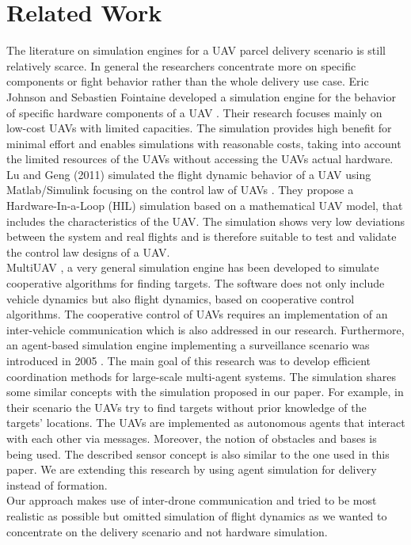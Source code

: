 \section{Related Work}
The literature on simulation engines for a UAV parcel delivery scenario is still relatively scarce. In general the researchers concentrate more on specific components or fight behavior rather than the whole delivery use case. Eric Johnson and Sebastien Fointaine developed a simulation engine for the behavior of specific hardware components of a UAV \cite{johnson.2001}. Their research focuses mainly on low-cost UAVs with limited capacities. The simulation provides high benefit for minimal effort and enables simulations with reasonable costs, taking into account the limited resources of the UAVs without accessing the UAVs actual hardware. Lu and Geng (2011) simulated the flight dynamic behavior of a UAV using Matlab/Simulink focusing on the control law of UAVs \cite{lu.2011}. They propose a Hardware-In-a-Loop (HIL) simulation based on a mathematical UAV model, that includes the characteristics of the UAV. The simulation shows very low deviations between the system and real flights and is therefore suitable to test and validate the control law designs of a UAV. \\
MultiUAV \cite{rasmussen.2003}, a very general simulation engine has been developed to simulate cooperative algorithms for finding targets. The software does not only include vehicle dynamics but also flight dynamics, based on cooperative control algorithms. The cooperative control of UAVs requires an implementation of an inter-vehicle communication which is also addressed in our research. Furthermore, an agent-based simulation engine implementing a surveillance scenario was introduced in 2005 \cite{jang.2005}. The main goal of this research was to develop efficient coordination methods for large-scale multi-agent systems. The simulation shares some similar concepts with the simulation proposed in our paper. For example, in their scenario the UAVs try to find targets without prior knowledge of the targets’ locations. The UAVs are implemented as autonomous agents that interact with each other via messages. Moreover, the notion of obstacles and bases is being used. The described sensor concept is also similar to the one used in this paper. We are extending this research by using agent simulation for delivery instead of formation.\\
Our approach makes use of inter-drone communication and tried to be most realistic as possible but omitted simulation of flight dynamics as we wanted to concentrate on the delivery scenario and not hardware simulation. 

